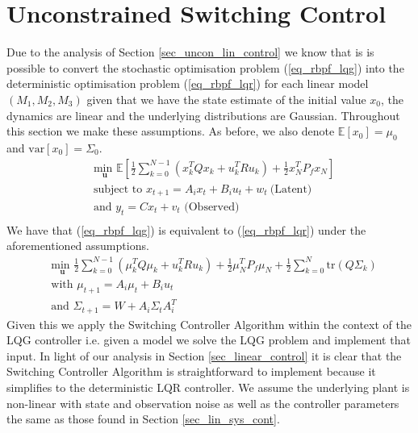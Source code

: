 \section{Unconstrained Switching Control}
Due to the analysis of Section \ref{sec_uncon_lin_control} we know that is is possible to convert the stochastic optimisation problem (\ref{eq_rbpf_lqg}) into the deterministic optimisation problem (\ref{eq_rbpf_lqr}) for each linear model $(M_1, M_2, M_3)$ given that we have the state estimate of the initial value $x_0$, the dynamics are linear and the underlying distributions are Gaussian. Throughout this section we make these assumptions. As before, we also denote $\mathbb{E}[x_0]=\mu_0$ and $\text{var}[x_0]=\Sigma_0$.
\begin{equation}
\begin{aligned}
&\underset{\mathbf{u}}{\text{min }} \mathbb{E}\left[ \frac{1}{2}\sum_{k=0}^{N-1} \left( x_k^TQx_k + u_k^TRu_k \right) + \frac{1}{2}x_N^TP_fx_N \right] \\
& \text{subject to } x_{t+1}=A_ix_t+B_iu_t + w_t~\text{(Latent)} \\
& \text{and } y_{t}= Cx_t + v_t \text{ (Observed)}\\
\end{aligned}
\label{eq_rbpf_lqg}
\end{equation}
We have that (\ref{eq_rbpf_lqg}) is equivalent to (\ref{eq_rbpf_lqr}) under the aforementioned assumptions.
\begin{equation}
\begin{aligned}
&\underset{\mathbf{u}}{\text{min }} \frac{1}{2}\sum_{k=0}^{N-1} \left( \mu_k^TQ\mu_k + u_k^TRu_k \right) + \frac{1}{2}\mu_N^TP_f\mu_N + \frac{1}{2}\sum_{k=0}^N \text{tr}(Q\Sigma_k) \\
&\text{with } \mu_{t+1} = A_i\mu_t +B_iu_t \\
&\text{and } \Sigma_{t+1} = W+A_i\Sigma_t A_i^T 
\end{aligned}
\label{eq_rbpf_lqr}
\end{equation}
Given this we apply the Switching Controller Algorithm within the context of the LQG controller i.e. given a model we solve the LQG problem and implement that input. In light of our analysis in Section \ref{sec_linear_control} it is clear that the Switching Controller Algorithm is straightforward to implement because it simplifies to the deterministic LQR controller. We assume the underlying plant is non-linear with state and observation noise as well as the controller parameters the same as those found in Section \ref{sec_lin_sys_cont}.

